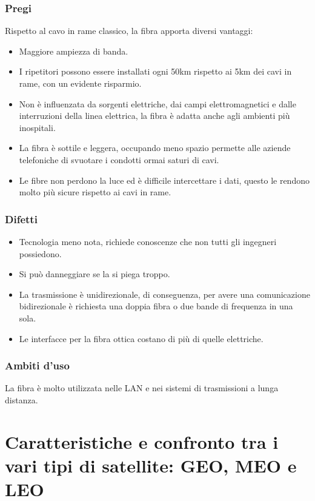 \subsubsection{Pregi}
Rispetto al cavo in rame classico, la fibra apporta diversi vantaggi:
\begin{itemize}
	\item	Maggiore ampiezza di banda.
	\item	I ripetitori possono essere installati ogni 50km rispetto ai 5km dei cavi in rame, con un evidente risparmio.
	\item	Non è influenzata da sorgenti elettriche, dai campi elettromagnetici e dalle interruzioni della linea elettrica, la fibra è adatta anche agli ambienti più inospitali.
	\item	La fibra è sottile e leggera, occupando meno spazio permette alle aziende telefoniche di svuotare i condotti ormai saturi di cavi.
	\item	Le fibre non perdono la luce ed è difficile intercettare i dati, questo le rendono molto più sicure rispetto ai cavi in rame.
\end{itemize}

\subsubsection{Difetti}
\begin{itemize}
	\item	Tecnologia meno nota, richiede conoscenze che non tutti gli ingegneri possiedono.
	\item	Si può danneggiare se la si piega troppo.
	\item	La trasmissione è unidirezionale, di conseguenza, per avere una comunicazione bidirezionale è richiesta una doppia fibra o due bande di frequenza in una sola.
	\item	Le interfacce per la fibra ottica costano di più di quelle elettriche.
\end{itemize}

\subsubsection{Ambiti d'uso}
La fibra è molto utilizzata nelle LAN e nei sistemi di trasmissioni a lunga distanza.

\section{Caratteristiche e confronto tra i vari tipi di satellite: GEO, MEO e LEO}\label{satelliti}

